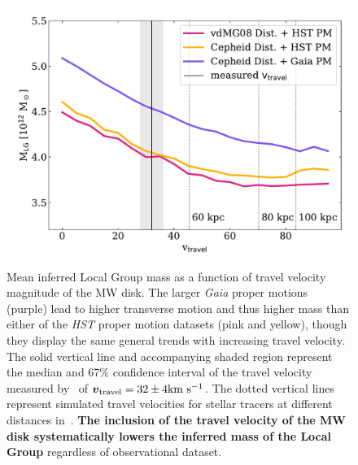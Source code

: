 \documentclass[twocolumn]{aastex631}
\newcommand{\bov}{\ensuremath{\boldsymbol{v}}}
\newcommand{\vtrav}{\ensuremath{\bov_{\rm travel}}}
\begin{document}
\begin{figure}[htb]
    \centering
    \includegraphics[width=\columnwidth]{analyze-runs-MvsV.pdf}
    \caption{\label{fig:mvsv}
    Mean inferred Local Group mass as a function of travel velocity
    magnitude of the MW disk.
    The larger \textit{Gaia} proper motions (purple) lead to higher transverse
    motion and thus higher mass than either of the \textit{HST} proper motion
    datasets (pink and yellow), though they display the same general trends with
     increasing travel velocity.
    The solid vertical line and accompanying shaded region represent the median 
    and 67\% confidence interval of the travel velocity measured
    by~\cite{Petersen2021} of $\vtrav=32\pm 4\kms$. 
    The dotted vertical lines represent simulated travel velocities for
    stellar tracers at different distances in~\cite{Garavito-Camargo2021b}.
    \textbf{The inclusion of the travel velocity of the MW disk systematically
    lowers the inferred mass of the Local Group} regardless of observational
    dataset.
    }
  \end{figure}

\end{document}
